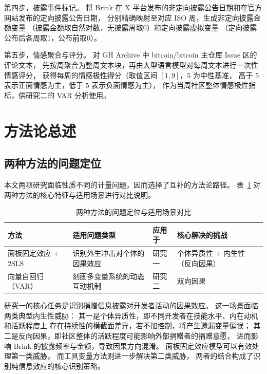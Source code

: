 \documentclass[
    type = master, %
    degree = professional,        %
    decl-page,  %
    twoside,                %
    fontset = fandol %
  ]{njuthesis}
\begin{document}
第四步，披露事件标记。
将 Brink 在 X 平台发布的非定向披露公告日期和在官方网站发布的定向披露公告日期，
分别精确映射至对应 ISO 周，生成非定向披露金额变量
（披露金额取自然对数，无披露周取0）和定向披露虚拟变量
（定向披露公布后各周取1，公布前取0）。

第五步，情感聚合与评分。
对 GH Archive 中 bitcoin/bitcoin 主仓库 Issue 区的评论文本，
先按周聚合为整周文本块，再由大型语言模型对每周文本进行一次性情感评分，
获得每周的情感极性得分（取值区间 $[1, 9]$，5 为中性基准，
高于 5 表示正面情感为主，低于 5 表示负面情感为主），
作为当周社区整体情感极性指标，供研究二的 VAR 分析使用。

\section{方法论总述}

\subsection{两种方法的问题定位}

本文两项研究面临性质不同的计量问题，因而选择了互补的方法论路径。
表~\ref{tab:method-comparison} 对两种方法的核心特征与适用场景进行对比说明。

\begin{table}[htbp]
    \centering
    \small
    \caption{两种方法的问题定位与适用场景对比}
    \label{tab:method-comparison}
    \begin{tabularx}{\textwidth}{lXXX}
        \toprule
        方法 & 适用问题类型 & 应用于 & 核心解决的挑战 \\
        \midrule
        面板固定效应 + 2SLS
            & 识别外生冲击对个体的因果效应
            & 研究一
            & 个体异质性 + 内生性（反向因果）\\
        向量自回归（VAR）
            & 刻画多变量系统的动态互动机制
            & 研究二
            & 双向因果\\
        \bottomrule
    \end{tabularx}
\end{table}

研究一的核心任务是识别捐赠信息披露对开发者活动的因果效应。
这一场景面临两类典型内生性威胁：
其一是个体异质性，即不同开发者在技能水平、内在动机和活跃程度上
存在持续性的横截面差异，若不加控制，将产生遗漏变量偏误；
其二是反向因果，即社区整体的活跃程度可能影响外部捐赠者的捐赠意愿，
进而影响 Brink 的披露频率与金额，导致因果方向混淆。
面板固定效应模型可以有效处理第一类威胁，
而工具变量方法则进一步解决第二类威胁，
两者的结合构成了识别纯信息效应的核心识别策略。
\end{document}
